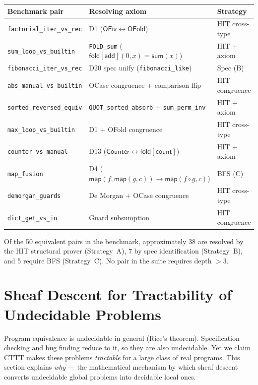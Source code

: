 \documentclass[11pt,a4paper]{report}
\theoremstyle{definition}
\theoremstyle{plain}
\newcommand{\fold}{\mathsf{fold}}
\begin{document}
\begin{center}
\small
\begin{longtable}{l l l}
\toprule
\textbf{Benchmark pair} & \textbf{Resolving axiom} & \textbf{Strategy} \\
\midrule
\texttt{factorial\_iter\_vs\_rec} &
  D1 ($\mathsf{OFix} \leftrightarrow \mathsf{OFold}$) &
  HIT cross-type \\
\texttt{sum\_loop\_vs\_builtin} &
  \texttt{FOLD\_sum} ($\fold[\mathsf{add}](0,x) = \mathsf{sum}(x)$) &
  HIT + axiom \\
\texttt{fibonacci\_iter\_vs\_rec} &
  D20 spec unify (\texttt{fibonacci\_like}) &
  Spec (B) \\
\texttt{abs\_manual\_vs\_builtin} &
  OCase congruence + comparison flip &
  HIT congruence \\
\texttt{sorted\_reversed\_equiv} &
  \texttt{QUOT\_sorted\_absorb} + \texttt{sum\_perm\_inv} &
  HIT + axiom \\
\texttt{max\_loop\_vs\_builtin} &
  D1 + OFold congruence &
  HIT cross-type \\
\texttt{counter\_vs\_manual} &
  D13 ($\mathsf{Counter} \leftrightarrow \fold[\mathsf{count}]$) &
  HIT + axiom \\
\texttt{map\_fusion} &
  D4 ($\mathsf{map}(f, \mathsf{map}(g, c)) \to
  \mathsf{map}(f \circ g, c)$) &
  BFS (C) \\
\texttt{demorgan\_guards} &
  De Morgan + OCase congruence &
  HIT cross-type \\
\texttt{dict\_get\_vs\_in} &
  Guard subsumption &
  HIT congruence \\
\bottomrule
\end{longtable}
\end{center}

Of the 50 equivalent pairs in the benchmark, approximately 38 are
resolved by the HIT structural prover (Strategy~A), 7 by spec
identification (Strategy~B), and 5 require BFS (Strategy~C).
No pair in the suite requires depth $> 3$.

\section{Sheaf Descent for Tractability of Undecidable Problems}
\label{sec:descent-tractability}

Program equivalence is undecidable in general (Rice's theorem).
Specification checking and bug finding reduce to it, so they are
also undecidable.  Yet we claim CTTT makes these problems
\emph{tractable} for a large class of real programs.  This section
explains \emph{why} --- the mathematical mechanism by which sheaf
descent converts undecidable global problems into decidable local ones.
\end{document}
